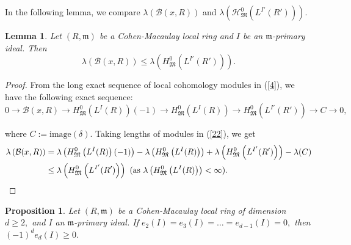 \documentclass[reqno,a4paper,dvipsnames]{amsart}
\newcommand{\m}{\mathfrak{m} }
\newcommand{\M}{\mathfrak{M}}
\newtheorem{lemma}[theorem]{Lemma}
\newtheorem{proposition}[theorem]{Proposition}
\theoremstyle{definition}
\begin{document}
In the following lemma, we compare $\lambda(\mathcal{B}(x,R))$ and $\lambda\left( {\mathcal H}^{0}_{\M}\left(L^{I'}(R')\right)\right).$



\begin{lemma} \label{comparing}
Let $(R, \m)$ be a Cohen-Macaulay local ring and $I$ be an $\m$-primary ideal. 
 Then 
 \begin{equation*}
     \lambda(\mathcal{B}(x,R))\leq \lambda\left(H^{0}_{\M}\left(L^{I'}(R')\right)\right).
 \end{equation*}
\end{lemma}

\begin{proof}
    From the long exact sequence of local cohomology modules in (\ref{4}), we have the following exact sequence:
    \begin{equation} \label{22}
       0 \longrightarrow \mathcal{B}(x,R)   \longrightarrow H^{0}_{\M}\left(L^{I}(R)\right)(-1) 
        \longrightarrow H^{0}_{\M}\left(L^{I}(R)\right) 
        \longrightarrow H^{0}_{\M}\left(L^{I'}(R')\right) 
        \longrightarrow C 
        \longrightarrow 0,
    \end{equation}

    where $C:=\textrm{image} (\delta)$. 
Taking  lengths of modules in (\ref{22}), we get
\begin{align*}
       \lambda\left(\mathcal{B}(x,R)\right)
 & = \lambda\left(H^{0}_{\M}\left(L^{I}(R)\right)(-1)\right)
  -\lambda\left(H^{0}_{\M}\left(L^{I}(R)\right)\right)
  +\lambda\left(H^{0}_{\M}\left(L^{I'}(R')\right)\right)
  - \lambda(C)\\
 & \leq \lambda\left(H^{0}_{\M}\left(L^{I'}(R')\right)\right)  \text{ (as  $\lambda\left(H^{0}_{\M}\left(L^{I}(R)\right)\right) < \infty)$}. \quad \quad\qedhere
\end{align*} 
\end{proof}


 \begin{proposition} \label{edresult}
     Let $(R, \m)$ be a Cohen-Macaulay local ring of dimension $d \geq 2,$ and $I$ an $\m$-primary ideal. If $e_{2}(I)=e_{3}(I)=\ldots=e_{d-1}(I)=0,$ then $(-1)^{d}e_{d}(I) \geq 0.$
\end{proposition}
\end{document}
